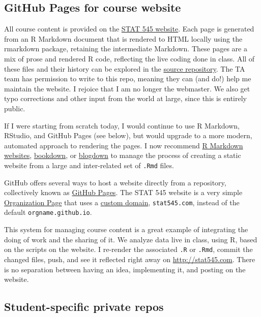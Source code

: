 \documentclass[
]{book}
\begin{document}
\subsection{GitHub Pages for course website}\label{github-pages-for-course-website}

All course content is provided on the \href{http://stat545.com}{STAT 545 website}. Each page is generated from an R Markdown document that is rendered to HTML locally using the rmarkdown package, retaining the intermediate Markdown. These pages are a mix of prose and rendered R code, reflecting the live coding done in class. All of these files and their history can be explored in the \href{https://github.com/STAT545-UBC/STAT545-UBC.github.io}{source repository}. The TA team has permission to write to this repo, meaning they can (and do!) help me maintain the website. I rejoice that I am no longer the webmaster. We also get typo corrections and other input from the world at large, since this is entirely public.

If I were starting from scratch today, I would continue to use R Markdown, RStudio, and GitHub Pages (see below), but would upgrade to a more modern, automated approach to rendering the pages. I now recommend \href{http://rmarkdown.rstudio.com/rmarkdown_websites.html}{R Markdown websites}, \href{https://bookdown.org}{bookdown}, or \href{https://bookdown.org/yihui/blogdown/}{blogdown} to manage the process of creating a static website from a large and inter-related set of \texttt{.Rmd} files.

GitHub offers several ways to host a website directly from a repository, collectively known as \href{https://help.github.com/categories/github-pages-basics/}{GitHub Pages}. The STAT 545 website is a very simple \href{https://help.github.com/articles/user-organization-and-project-pages/}{Organization Page} that uses a \href{https://help.github.com/articles/custom-domain-redirects-for-github-pages-sites/}{custom domain}, \texttt{stat545.com}, instead of the default \texttt{orgname.github.io}.

This system for managing course content is a great example of integrating the doing of work and the sharing of it. We analyze data live in class, using R, based on the scripts on the website. I re-render the associated \texttt{.R} or \texttt{.Rmd}, commit the changed files, push, and see it reflected right away on \url{http://stat545.com}. There is no separation between having an idea, implementing it, and posting on the website.

\subsection{Student-specific private repos}\label{student-specific-private-repos}
\end{document}
